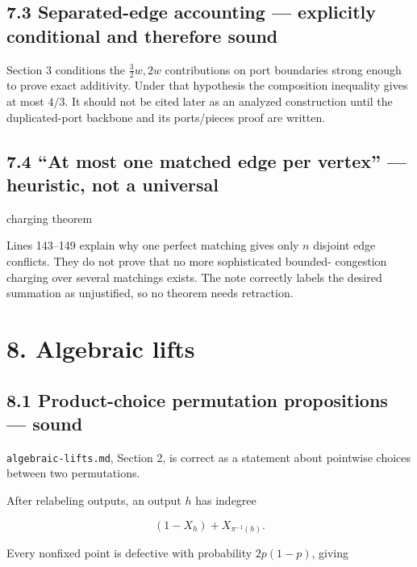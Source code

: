 \documentclass[11pt,a4paper]{article}
\begin{document}
\subsection*{7.3 Separated-edge accounting — explicitly conditional and therefore sound}

Section 3 conditions the \(\tfrac32w,2w\) contributions on port boundaries strong enough to prove exact additivity.  Under that hypothesis the composition inequality gives at most \(4/3\).  It should not be cited later as an analyzed construction until the duplicated-port backbone and its ports/pieces proof are written.


\subsection*{7.4 “At most one matched edge per vertex” — heuristic, not a universal}

charging theorem


Lines 143–149 explain why one perfect matching gives only \(n\) disjoint edge conflicts.  They do not prove that no more sophisticated bounded- congestion charging over several matchings exists.  The note correctly labels the desired summation as unjustified, so no theorem needs retraction.


\section*{8. Algebraic lifts}

\subsection*{8.1 Product-choice permutation propositions — sound}

\nolinkurl{algebraic-lifts.md}, Section 2, is correct as a statement about pointwise choices between two permutations.


After relabeling outputs, an output \(h\) has indegree


\[
 (1-X_h)+X_{\pi^{-1}(h)}.
\]

Every nonfixed point is defective with probability \(2p(1-p)\), giving
\end{document}
